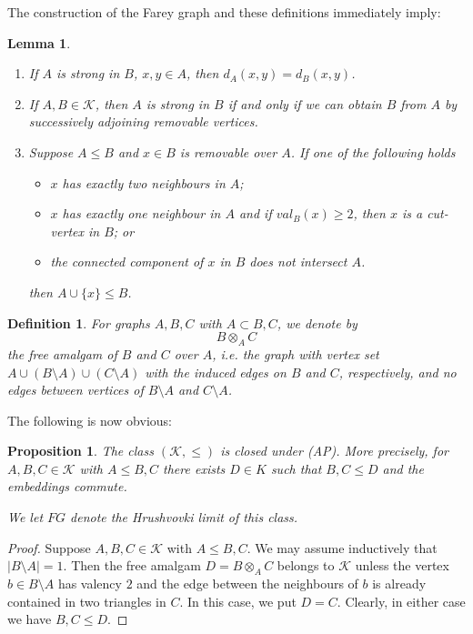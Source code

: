 \documentclass{amsart}
\newcommand{\K}{\mathcal{K}}
\newtheorem{definition}[defi]{Definition}
\newtheorem{lemma}[defi]{Lemma}
\newtheorem{proposition}[defi]{Proposition}
\begin{document}
The construction of the Farey graph and these definitions immediately imply:

\begin{lemma}\label{lem:strong after removing point}
\begin{enumerate}
\item   If $A$ is strong in $B$, $x,y\in A$, then $d_A(x,y)=d_B(x,y)$.
\item   If $A, B\in \K$, then $A$ is strong in $B$ if and only if we can obtain $B$ from $A$ by successively adjoining removable vertices.
\item  Suppose $A\leq B$ and $x\in B$ is removable over $A$. If one of the following holds
\begin{itemize}
\item $x$ has exactly two neighbours in $A$;
\item $x$ has exactly one neighbour in $A$ and if $val_B(x)\geq 2$, then $x$ is a cut-vertex in $B$; or
\item the connected component of $x$  in $B$ does not intersect $A$.
\end{itemize}
then $A\cup \{x \}\leq B$.
\end{enumerate}
  
  

   
\end{lemma}

\begin{definition}\label{def:free amalgam}
For graphs $A, B, C$ with $A\subset B, C$, we denote by
\[B\otimes_A C\]
the free amalgam of $B$ and $C$ over $A$, i.e. the graph with vertex set $A\cup (B\setminus A)\cup (C\setminus A)$ with the induced edges on $B$ and $C$, respectively, and no edges between vertices of $B\setminus A$ and $C\setminus A$.
\end{definition}

The following is now obvious:
\begin{proposition}\label{prop:amalgamtion}
    The class $(\K,\leq)$ is closed under (AP). More precisely, for  $A, B, C\in \K$ with $A\leq B, C$ there exists $D\in K$ such that $B,C\leq D$ and the embeddings commute.
    
    We let $FG$ denote the Hrushvovki limit of this class.
\end{proposition}
\begin{proof}
Suppose $A, B, C\in \K$ with $A\leq B, C$. We may assume inductively that $|B\setminus A|=1$. Then the free amalgam $D=B\otimes _A C$ belongs to $\K$ unless the vertex $b\in B\setminus A$ has valency $2$ and the edge between the neighbours of $b$ is already contained in two triangles in $C$. In this case, we put $D=C$. Clearly, in either case we have $B, C\leq D$. 
\end{proof}
\end{document}
